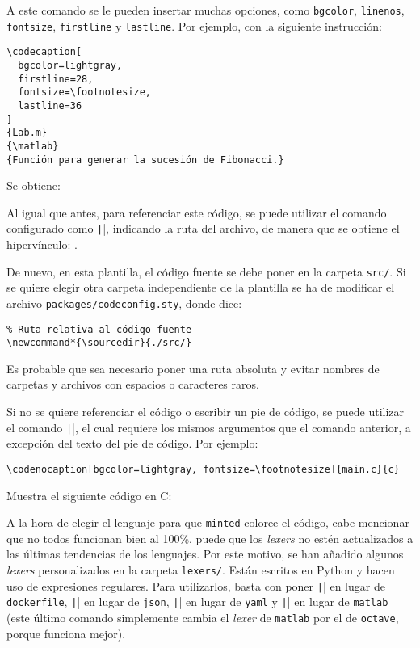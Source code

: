 \documentclass[../../main.tex]{subfile}
\begin{document}
  A este comando se le pueden insertar muchas opciones, como \texttt{bgcolor}, \texttt{linenos}, \texttt{fontsize}, \texttt{firstline} y \texttt{lastline}. Por ejemplo, con la siguiente instrucción:

  \begin{verbatim}
\codecaption[
  bgcolor=lightgray,
  firstline=28,
  fontsize=\footnotesize,
  lastline=36
]
{Lab.m}
{\matlab}
{Función para generar la sucesión de Fibonacci.}
  \end{verbatim}

  Se obtiene:


  Al igual que antes, para referenciar este código, se puede utilizar el comando configurado como \texttt||, indicando la ruta del archivo, de manera que se obtiene el hipervínculo: .

  De nuevo, en esta plantilla, el código fuente se debe poner en la carpeta \texttt{src/}. Si se quiere elegir otra carpeta independiente de la plantilla se ha de modificar el archivo \texttt{packages/codeconfig.sty}, donde dice:

  \begin{verbatim}
% Ruta relativa al código fuente
\newcommand*{\sourcedir}{./src/}
  \end{verbatim}

  Es probable que sea necesario poner una ruta absoluta y evitar nombres de carpetas y archivos con espacios o caracteres raros.

  Si no se quiere referenciar el código o escribir un pie de código, se puede utilizar el comando \texttt|\codenocaption|, el cual requiere los mismos argumentos que el comando anterior, a excepción del texto del pie de código. Por ejemplo:

  \begin{verbatim}
\codenocaption[bgcolor=lightgray, fontsize=\footnotesize]{main.c}{c}
  \end{verbatim}

  Muestra el siguiente código en C:


  A la hora de elegir el lenguaje para que \texttt{minted} coloree el código, cabe mencionar que no todos funcionan bien al 100\%, puede que los \textit{lexers} no estén actualizados a las últimas tendencias de los lenguajes. Por este motivo, se han añadido algunos \textit{lexers} personalizados en la carpeta \texttt{lexers/}. Están escritos en Python y hacen uso de expresiones regulares. Para utilizarlos, basta con poner \texttt|\dockerfile| en lugar de \texttt{dockerfile}, \texttt|\json| en lugar de \texttt{json}, \texttt|\yaml| en lugar de \texttt{yaml} y \texttt|\matlab| en lugar de \texttt{matlab} (este último comando simplemente cambia el \textit{lexer} de \texttt{matlab} por el de \texttt{octave}, porque funciona mejor).
\end{document}
